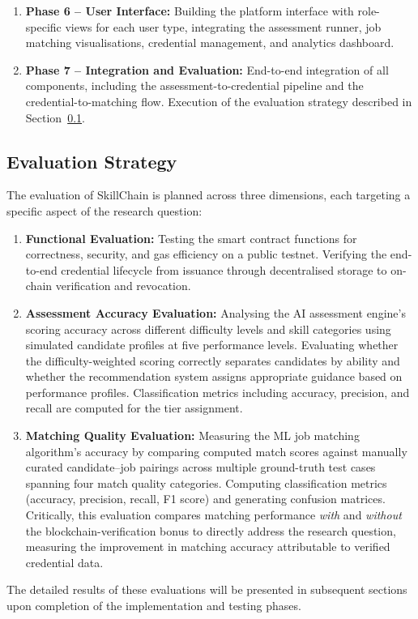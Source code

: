 \begin{enumerate}
    \item \textbf{Phase 6 -- User Interface:} Building the platform interface with role-specific views for each user type, integrating the assessment runner, job matching visualisations, credential management, and analytics dashboard.

    \item \textbf{Phase 7 -- Integration and Evaluation:} End-to-end integration of all components, including the assessment-to-credential pipeline and the credential-to-matching flow. Execution of the evaluation strategy described in Section~\ref{sec:EvalStrategy}.
\end{enumerate}

\subsection{Evaluation Strategy}
\label{sec:EvalStrategy}

The evaluation of SkillChain is planned across three dimensions, each targeting a specific aspect of the research question:

\begin{enumerate}
    \item \textbf{Functional Evaluation:} Testing the smart contract functions for correctness, security, and gas efficiency on a public testnet. Verifying the end-to-end credential lifecycle from issuance through decentralised storage to on-chain verification and revocation.

    \item \textbf{Assessment Accuracy Evaluation:} Analysing the AI assessment engine's scoring accuracy across different difficulty levels and skill categories using simulated candidate profiles at five performance levels. Evaluating whether the difficulty-weighted scoring correctly separates candidates by ability and whether the recommendation system assigns appropriate guidance based on performance profiles. Classification metrics including accuracy, precision, and recall are computed for the tier assignment.

    \item \textbf{Matching Quality Evaluation:} Measuring the ML job matching algorithm's accuracy by comparing computed match scores against manually curated candidate--job pairings across multiple ground-truth test cases spanning four match quality categories. Computing classification metrics (accuracy, precision, recall, F1 score) and generating confusion matrices. Critically, this evaluation compares matching performance \textit{with} and \textit{without} the blockchain-verification bonus to directly address the research question, measuring the improvement in matching accuracy attributable to verified credential data.
\end{enumerate}

\noindent The detailed results of these evaluations will be presented in subsequent sections upon completion of the implementation and testing phases.
